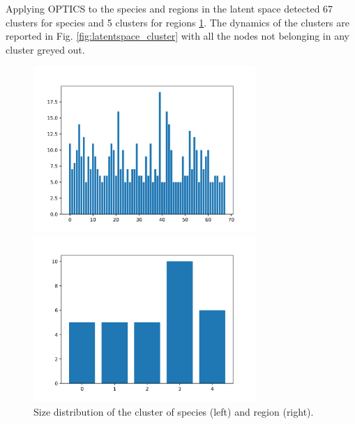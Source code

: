 \documentclass[mscthesis]{usiinfthesis}
\begin{document}
Applying OPTICS to the species and regions in the latent space detected 67 clusters for species and 5 clusters for regions \ref{fig:cluster_density}. The dynamics of the clusters are reported in Fig. \ref{fig:latentspace_cluster} with all the nodes not belonging in any cluster greyed out.

\begin{figure}[ht] 
  \label{ fig7} 
  \begin{minipage}[b]{0.5\linewidth}
    \centering
        \includegraphics[width=0.75\textwidth]{cluster_distribution_species.png}
    \vspace{4ex}
  \end{minipage}%
  \begin{minipage}[b]{0.5\linewidth}
    \centering
     \includegraphics[width=0.75\textwidth]{cluster_distribution_region.png}
    \vspace{4ex}
  \end{minipage} 
\caption{Size distribution of the cluster of species (left) and region (right).}
\label{fig:cluster_density}
\end{figure}
\end{document}

